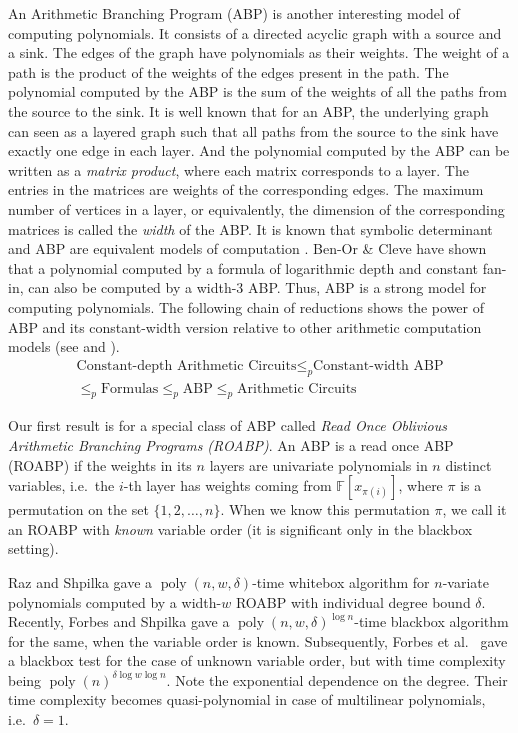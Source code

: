 \documentclass[final,oneeqnum, onethmnum, onefignum]{siamltex1213}
\newcommand{\F}{\mathbb F}
\newcommand{\degree}{\delta} %
\DeclareMathOperator{\poly}{poly}
\begin{document}
An Arithmetic Branching Program (ABP) 
is another interesting model of computing polynomials. 
It consists of a directed acyclic graph with a source and a sink. 
The edges of the graph have polynomials as their weights.
The weight of a path is the product of the weights of the edges
present in the path. 
The polynomial computed by the ABP
is the sum of the weights of all the paths from the source to the sink.
It is well known that for an ABP, the underlying graph 
can seen as a layered graph such that all paths from the source to
the sink have exactly one edge in each layer. 
And the polynomial computed by the ABP can be written as 
a \emph{matrix product}, where each matrix corresponds to a layer. 
The entries in the matrices are weights of the corresponding edges. 
The maximum number of vertices in a layer, 
or equivalently, the dimension of the corresponding matrices 
is called the \emph{width }of the ABP.
It is known that symbolic determinant and ABP are equivalent models of computation
\cite{Tod91, MV97}.
Ben-Or \& Cleve \cite{BOC92} have shown that 
a polynomial computed by a formula of logarithmic depth and constant fan-in,
can also be computed by a width-$3$ ABP.
Thus, ABP is a strong model for computing polynomials.
The following chain of reductions shows the power of ABP and its constant-width 
version relative to
other arithmetic computation models (see \cite{BOC92} and \cite[Lemma 1]{Nis91}).
\begin{eqnarray*} 
&\text{Constant-depth Arithmetic Circuits} 
\leq_p  \text{Constant-width ABP} &\\
 & \leq_p  \text{Formulas} 
 \leq_p  \text{ABP}
 \leq_p  \text{Arithmetic Circuits}&
\end{eqnarray*}

Our first result is for a special class of ABP called 
{\em Read Once Oblivious Arithmetic Branching Programs (ROABP)}.
An ABP is a read once ABP (ROABP) if the weights in its $n$ layers
are univariate polynomials in $n$ distinct variables, i.e.\ 
the $i$-th layer has weights coming from $\F[x_{\pi(i)}]$, 
where $\pi$ is a permutation on the set $\{1, 2, \dots, n\}$.
When we know this permutation $\pi$, we call it an ROABP with {\em known} variable order
(it is significant only in the blackbox setting).

Raz and Shpilka \cite{RS05} gave a $\poly(n, w, \degree)$-time whitebox
algorithm for $n$-variate polynomials computed by a width-$w$ ROABP with
individual degree bound $\degree$.
Recently, Forbes and Shpilka \cite{FS12,FS13} gave a $\poly(n, w, \degree)^{\log n}$-time blackbox 
algorithm for the same, when the variable order is known.
Subsequently, Forbes et al.\ \cite{FSS13} gave a 
blackbox test for the case of unknown variable order, but 
with time complexity being $\poly(n)^{\degree \log w \log n}$.
Note the exponential dependence on the degree. 
Their time complexity becomes quasi-polynomial in case of multilinear polynomials, 
i.e.\ $\degree =1$.
\end{document}

